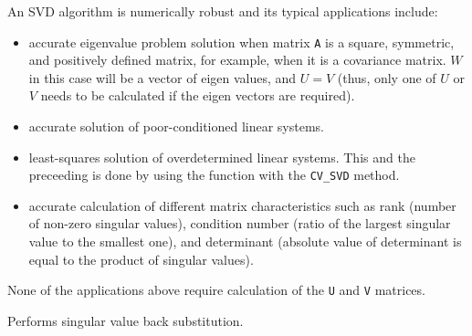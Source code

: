 An SVD algorithm is numerically robust and its typical applications include:

\begin{itemize}
  \item accurate eigenvalue problem solution when matrix \texttt{A}
  is a square, symmetric, and positively defined matrix, for example, when
  it is a covariance matrix. $W$ in this case will be a vector
  of eigen values, and $U = V$
  (thus, only one of $U$ or $V$ needs to be calculated if
  the eigen vectors are required).
  \item accurate solution of poor-conditioned linear systems.
  \item least-squares solution of overdetermined linear systems. This and the preceeding is done by using the  function with the \texttt{CV\_SVD} method.
  \item accurate calculation of different matrix characteristics such as rank (number of non-zero singular values), condition number (ratio of the largest singular value to the smallest one), and determinant (absolute value of determinant is equal to the product of singular values). 
\end{itemize}

None of the applications above require calculation of the \texttt{U} and \texttt{V} matrices.

\label{SVBkSb}

Performs singular value back substitution.


\begin{description}
\end{description}

